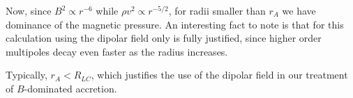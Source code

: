 \documentclass[main.tex]{subfiles}
\begin{document}
Now, since \(B^2 \propto r^{-6}\) while \(\rho v^2 \propto r^{-5/2}\), for radii smaller than \(r_A\) we have dominance of the magnetic pressure. 
An interesting fact to note is that for this calculation using the dipolar field only is fully justified, since higher order multipoles decay even faster as the radius increases.

Typically, \(r_A < R_{LC}\), which justifies the use of the dipolar field in our treatment of \(B\)-dominated accretion.

\end{document}
